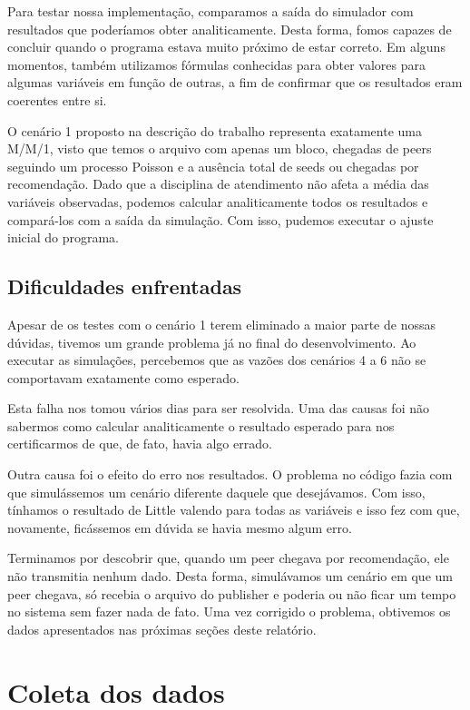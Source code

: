 \documentclass[a4paper,10pt]{article}
\begin{document}
Para testar nossa implementação, comparamos a saída do simulador com resultados que poderíamos obter analiticamente. Desta forma, fomos capazes de concluir quando o programa estava muito próximo de estar correto. Em alguns momentos, também utilizamos fórmulas conhecidas para obter valores para algumas variáveis em função de outras, a fim de confirmar que os resultados eram coerentes entre si.

O cenário 1 proposto na descrição do trabalho representa exatamente uma M/M/1, visto que temos o arquivo com apenas um bloco, chegadas de peers seguindo um processo Poisson e a ausência total de seeds ou chegadas por recomendação. Dado que a disciplina de atendimento não afeta a média das variáveis observadas, podemos calcular analiticamente todos os resultados e compará-los com a saída da simulação. Com isso, pudemos executar o ajuste inicial do programa.

\subsection{Dificuldades enfrentadas}

Apesar de os testes com o cenário 1 terem eliminado a maior parte de nossas dúvidas, tivemos um grande problema já no final do desenvolvimento. Ao executar as simulações, percebemos que as vazões dos cenários 4 a 6 não se comportavam exatamente como esperado.

Esta falha nos tomou vários dias para ser resolvida. Uma das causas foi não sabermos como calcular analiticamente o resultado esperado para nos certificarmos de que, de fato, havia algo errado.

Outra causa foi o efeito do erro nos resultados. O problema no código fazia com que simulássemos um cenário diferente daquele que desejávamos. Com isso, tínhamos o resultado de Little valendo para todas as variáveis e isso fez com que, novamente, ficássemos em dúvida se havia mesmo algum erro.

Terminamos por descobrir que, quando um peer chegava por recomendação, ele não transmitia nenhum dado. Desta forma, simulávamos um cenário em que um peer chegava, só recebia o arquivo do publisher e poderia ou não ficar um tempo no sistema sem fazer nada de fato. Uma vez corrigido o problema, obtivemos os dados apresentados nas próximas seções deste relatório.

\pagebreak

\section{Coleta dos dados}\label{ColetaDosDados}
\end{document}
